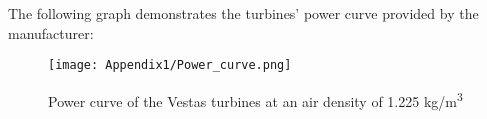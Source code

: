 The following graph demonstrates the turbines' power curve provided by the manufacturer:

\begin{figure}[H]
    \begin{center}
      \texttt{[image: Appendix1/Power\_curve.png]}
    \end{center}
    \caption{Power curve of the Vestas turbines at an air density of 1.225 kg/m\textsuperscript{3}}
  \end{figure}